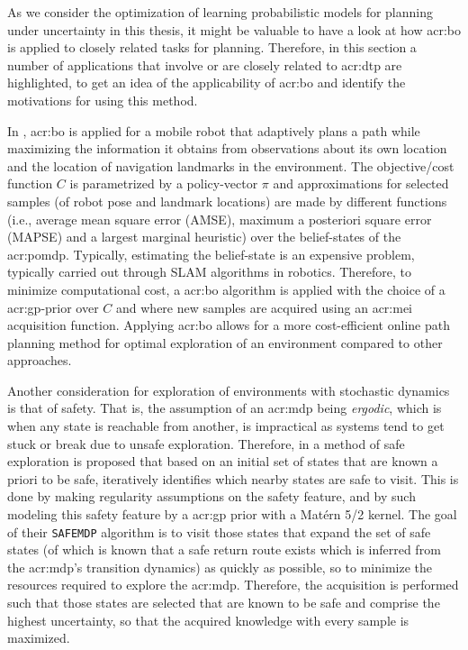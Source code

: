 As we consider the optimization of learning probabilistic models for planning under uncertainty in this thesis, it might be valuable to have a look at how \acrlong{acr:bo} is applied to closely related tasks for planning.
Therefore, in this section a number of applications that involve or are closely related to \acrshort{acr:dtp} are highlighted, to get an idea of the applicability of \acrlong{acr:bo} and identify the motivations for using this method.

In \cite{MartinezCantin2009}, \acrlong{acr:bo} is applied for a mobile robot that adaptively plans a path while maximizing the information it obtains from observations about its own location and the location of navigation landmarks in the environment.
The objective/cost function $C$ is parametrized by a policy-vector $\pi$ and approximations for selected samples (of robot pose and landmark locations) are made by different functions (i.e., average mean square error (AMSE), maximum a posteriori square error (MAPSE) and a largest marginal heuristic) over the belief-states of the \acrshort{acr:pomdp}.
Typically, estimating the belief-state is an expensive problem, typically carried out through SLAM algorithms in robotics.
Therefore, to minimize computational cost, a \acrlong{acr:bo} algorithm is applied with the choice of a \acrshort{acr:gp}-prior over $C$ and where new samples are acquired using an \acrshort{acr:mei} acquisition function.
Applying \acrlong{acr:bo} allows for a more cost-efficient online path planning method for optimal exploration of an environment compared to other approaches.

Another consideration for exploration of environments with stochastic dynamics is that of safety. That is, the assumption of an \acrshort{acr:mdp} being \textit{ergodic}, which is when any state is reachable from another, is impractical as systems tend to get stuck or break due to unsafe exploration. Therefore, in \cite{turchetta2016safe} a method of safe exploration is proposed that based on an initial set of states that are known a priori to be safe, iteratively identifies which nearby states are safe to visit.
This is done by making regularity assumptions on the safety feature, and by such modeling this safety feature by a \acrshort{acr:gp} prior with a Mat\'ern 5/2 kernel.
The goal of their \texttt{SAFEMDP} algorithm is to visit those states that expand the set of safe states (of which is known that a safe return route exists which is inferred from the \acrshort{acr:mdp}'s transition dynamics) as quickly as possible, so to minimize the resources required to explore the \acrshort{acr:mdp}.
Therefore, the acquisition is performed such that those states are selected that are known to be safe and comprise the highest uncertainty, so that the acquired knowledge with every sample is maximized.

